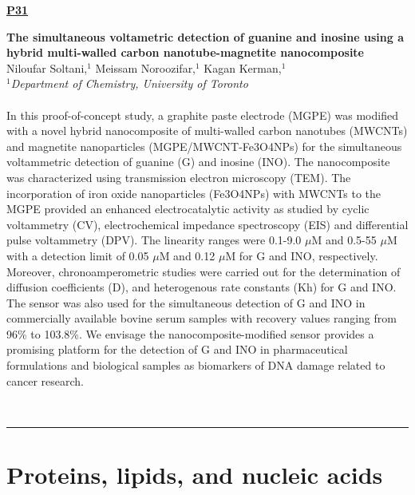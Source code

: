 \documentclass[titlepage,oneside,openany,10pt]{book}
\newenvironment{posterabs}[4] %
        {
	\begin{flushright}
                \underline{\textbf{#4}}
        \end{flushright}
        \textbf{#1}\\%
        #2\\%
        \textit{#3}\\\\%
        }
        {
        \\
        \noindent\rule{15cm}{0.5pt}%
        }
\begin{document}
\newpage

\begin{posterabs}
	{The simultaneous voltametric detection of guanine and inosine using a hybrid multi-walled carbon nanotube-magnetite nanocomposite}
	{Niloufar Soltani,$^{1}$ Meissam Noroozifar,$^{1}$ Kagan Kerman,$^{1}$}
	{
	$^1$Department of Chemistry, University of Toronto
	}
	{P31}
	In this proof-of-concept study, a graphite paste electrode (MGPE) was modified with a novel hybrid nanocomposite of multi-walled carbon nanotubes (MWCNTs) and magnetite nanoparticles (MGPE/MWCNT-Fe3O4NPs) for the simultaneous voltammetric detection of guanine (G) and inosine (INO). The nanocomposite was characterized using transmission electron microscopy (TEM). The incorporation of iron oxide nanoparticles (Fe3O4NPs) with MWCNTs to the MGPE provided an enhanced electrocatalytic activity as studied by cyclic voltammetry (CV), electrochemical impedance spectroscopy (EIS) and differential pulse voltammetry (DPV). The linearity ranges were 0.1-9.0 $\mu$M and 0.5-55 $\mu$M with a detection limit of 0.05 $\mu$M and 0.12 $\mu$M for G and INO, respectively. Moreover, chronoamperometric studies were carried out for the determination of diffusion coefficients (D), and heterogenous rate constants (Kh) for G and INO. The sensor was also used for the simultaneous detection of G and INO in commercially available bovine serum samples with recovery values ranging from 96\% to 103.8\%. We envisage the nanocomposite-modified sensor provides a promising platform for the detection of G and INO in pharmaceutical formulations and biological samples as biomarkers of DNA damage related to cancer research.
	\label{SoltaniN}
\end{posterabs}


\newpage

\section*{Proteins, lipids, and nucleic acids}
\label{sec:prot}
\end{document}
